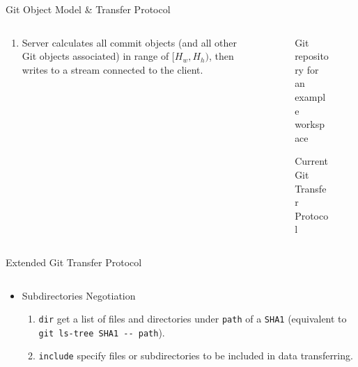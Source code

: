 \documentclass[final]{beamer}
\begin{document}
\begin{frame}[t, fragile]
\begin{columns}[t]
\begin{column}{.49\linewidth}
\begin{block}{Git Object Model \& Transfer Protocol}
\begin{columns}[T]
\begin{column}{.47\textwidth}
\begin{enumerate}
  \item Server calculates all commit objects (and all other Git objects
    associated) in range of $[H_w, H_h)$, then writes to a stream connected to
    the client.
\end{enumerate}
          \end{column}
          \begin{column}{.5\textwidth}
              \begin{figure}\centering
                \caption{Git repository for an example workspace}
              \end{figure}
            \begin{figure} \centering
              \caption{Current Git Transfer Protocol}
            \end{figure}
          \end{column}
        \end{columns}
      \end{block}
      \begin{block}{Extended Git Transfer Protocol}

        \begin{columns}[T]
          \begin{column}{.5\textwidth}
\begin{itemize}
    \justifying
  \item Subdirectories Negotiation
    \begin{enumerate}
  \item \verb|dir| get a list of files and directories under \verb|path| of a
    \verb|SHA1| (equivalent to \verb|git ls-tree SHA1 -- path|).

  \item \verb|include| specify files or subdirectories to be included in data
    transferring.


\end{enumerate}
\end{itemize}
\end{column}
\end{columns}
\end{block}
\end{column}
\end{columns}
\end{frame}
\end{document}
